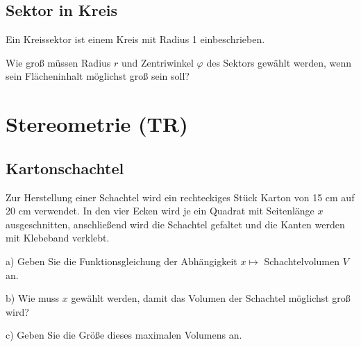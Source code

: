 \subsection{Sektor in Kreis}

Ein Kreissektor ist einem Kreis mit Radius 1 einbeschrieben.

Wie groß müssen Radius $r$ und Zentriwinkel $\varphi$ des Sektors gewählt werden, wenn sein
Flächeninhalt möglichst groß sein soll?


\newpage\section{Stereometrie (TR)}

\subsection{Kartonschachtel}
Zur Herstellung einer Schachtel wird ein rechteckiges
Stück Karton von 15 cm auf 20 cm verwendet. In
den vier Ecken wird je ein Quadrat mit Seitenlänge $x$
ausgeschnitten, anschließend wird die Schachtel
gefaltet und die Kanten werden mit Klebeband
verklebt.

a)
Geben Sie die Funktionsgleichung der Abhängigkeit $x \mapsto$ Schachtelvolumen $V$ an.

b)
Wie muss $x$ gewählt werden, damit das Volumen
der Schachtel möglichst groß wird?

c)
Geben Sie die Größe dieses maximalen Volumens
an.


